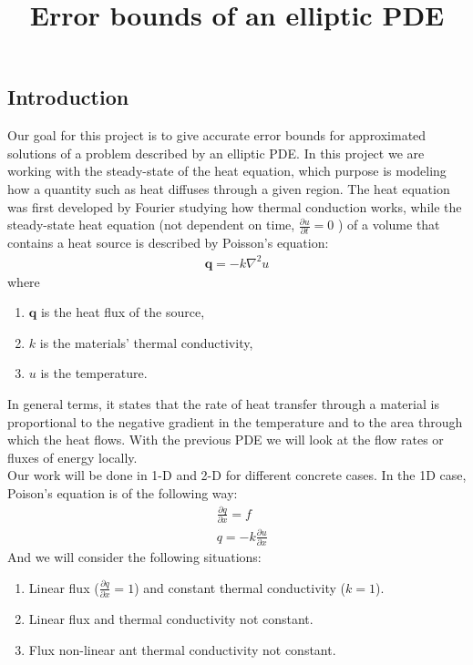 \documentclass{article}
\title{Error bounds of an elliptic PDE}
\date{}
\begin{document}
    \maketitle
    \subsection*{Introduction}
    Our goal for this project is to give accurate error bounds for approximated solutions of a problem described by an elliptic PDE. In this project we are working with the steady-state of the heat equation, which purpose is modeling how a quantity such as heat diffuses through a given region. The heat equation was first developed by Fourier studying how thermal conduction works, while the steady-state heat equation (not dependent on time, $\frac{\partial u}{\partial t} = 0$ ) of a volume that contains a heat source is described by Poisson's equation:
    \begin{align*}
        \bm{q} = -k \nabla ^2 u
    \end{align*}
    where 
    \begin{enumerate}
        \item[] $\bm{q}$ is the heat flux of the source,
        \item[] $k$ is the materials' thermal conductivity,
        \item[] $u$ is the temperature.
    \end{enumerate}

    In general terms, it states that the rate of heat transfer through a material is proportional to the negative gradient in the temperature and to the area through which the heat flows. With the previous PDE we will look at the flow rates or fluxes of energy locally. \\
    Our work will be done in 1-D and 2-D for different concrete cases. In the 1D case, Poison's equation is of the following way:
    \begin{align*}
        &\frac{\partial q}{\partial x} = f \\
        &q = -k \frac{\partial u}{\partial x} 
    \end{align*}
    And we will consider the following situations:
    \begin{enumerate}
        \item Linear flux ($\frac{\partial q}{\partial x} = 1$) and constant thermal conductivity ($k=1$).
        \item Linear flux and thermal conductivity not constant.
        \item Flux non-linear ant thermal conductivity not constant.
    \end{enumerate}
\end{document}
